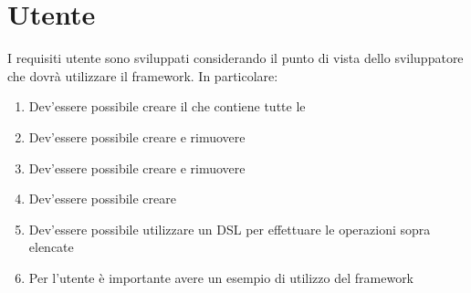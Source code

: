 \section{Utente}\label{sec:utente}
I requisiti utente sono sviluppati considerando il punto di vista dello sviluppatore che dovrà utilizzare il framework.
In particolare:
\begin{enumerate}[label=\textbf{\ref{sec:utente}.\arabic*}]
    \item \label{itm:u1} Dev'essere possibile creare il \World che contiene tutte le \Entity
    \item \label{itm:u2} Dev'essere possibile creare e rimuovere \Component
    \item \label{itm:u3} Dev'essere possibile creare e rimuovere \Entity
    \item \label{itm:u4} Dev'essere possibile creare \System
    \item \label{itm:u5} Dev'essere possibile utilizzare un DSL per effettuare le operazioni sopra elencate
    \item \label{itm:u6} Per l'utente è importante avere un esempio di utilizzo del framework
\end{enumerate}

